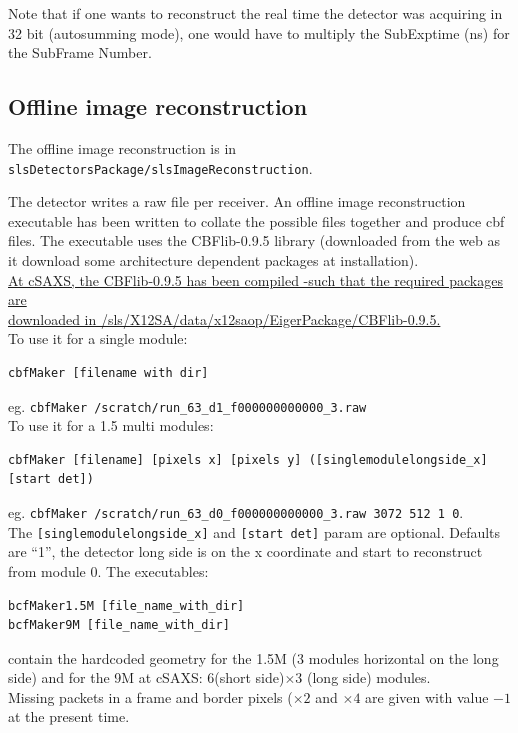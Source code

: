 \documentclass{article}
\begin{document}
Note that if one wants to  reconstruct the real time the detector was acquiring in 32 bit (autosumming mode), one would have to multiply the SubExptime (ns) for the SubFrame Number. 

\subsection{Offline image reconstruction}
The offline image reconstruction is in {\tt{slsDetectorsPackage/slsImageReconstruction}}.

The detector writes a raw file per receiver. An offline image reconstruction executable has been written to collate the possible files together and produce cbf files. The executable uses the CBFlib-0.9.5 library (downloaded from the web as it download some architecture dependent packages at installation).\\
\underline{At cSAXS, the CBFlib-0.9.5 has been compiled -such that the required packages are}\\\underline{ downloaded in /sls/X12SA/data/x12saop/EigerPackage/CBFlib-0.9.5.}\\ 

To use it for a single module:
\begin{verbatim}
cbfMaker [filename with dir]
\end{verbatim}
eg.
{\tt{cbfMaker /scratch/run\_63\_d1\_f000000000000\_3.raw}}\\

To use it for a 1.5 multi modules:
\begin{verbatim}
cbfMaker [filename] [pixels x] [pixels y] ([singlemodulelongside_x] [start det])
\end{verbatim}
eg.
{\tt cbfMaker /scratch/run\_63\_d0\_f000000000000\_3.raw  3072 512 1 0}.\\
The {\tt{[singlemodulelongside\_x]}} and {\tt{[start det]}} param are optional. Defaults are ``1'', the detector long side is on the x coordinate and start to reconstruct from module 0. 
The executables: 
\begin{verbatim}
bcfMaker1.5M [file_name_with_dir]
bcfMaker9M [file_name_with_dir]
\end{verbatim}
contain the hardcoded geometry for the 1.5M (3 modules horizontal on the long side) and for the 9M at cSAXS: 6(short side)$\times$3 (long side) modules.\\ 
Missing packets in a frame and border pixels ($\times 2$ and $\times 4$ are given with value $-1$ at the present time.
\end{document}
